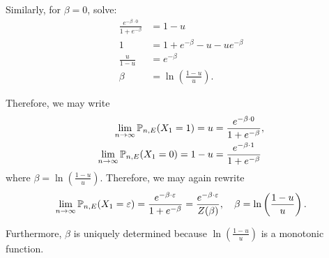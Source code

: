 \documentclass{article}
\begin{document}
Similarly, for $\beta = 0$, solve:
\begin{align}
  \frac{e^{-\beta \cdot 0}}{1 + e^{-\beta}} &= 1 - u\\
  1 &= 1 + e^{-\beta} - u - ue^{-\beta} \\
  \frac{u}{1-u} &= e^{-\beta} \\
  \beta &= \ln \left( \frac{1-u}{u} \right).
\end{align}

Therefore, we may write
\begin{align}
  \lim_{n \rightarrow \infty} \mathbb{P}_{n,E}(X_1 = 1) = u &= \frac{e^{-\beta \cdot 0}}{1 + e^{-\beta}}, \\
  \lim_{n \rightarrow \infty} \mathbb{P}_{n, E}(X_1 = 0) = 1 - u &= \frac{e^{-\beta \cdot 1}}{1 + e^{-\beta}}
\end{align}
where $\beta = \ln \left( \frac{1 - u}{u} \right)$. Therefore, we may again rewrite
\begin{align}
  \lim_{n \rightarrow \infty} \mathbb{P}_{n, E}(X_1 = \varepsilon) = \frac{e^{-\beta\cdot\varepsilon}}{1 + e^{-\beta}} = \frac{e^{-\beta \cdot \varepsilon}}{Z(\beta)}, \quad \beta = \ln \left( \frac{1 - u}{u} \right).
\end{align}

Furthermore, $\beta$ is uniquely determined because $\ln \left( \frac{1 - u}{u} \right)$ is a monotonic function.

\printindex
\end{document}
